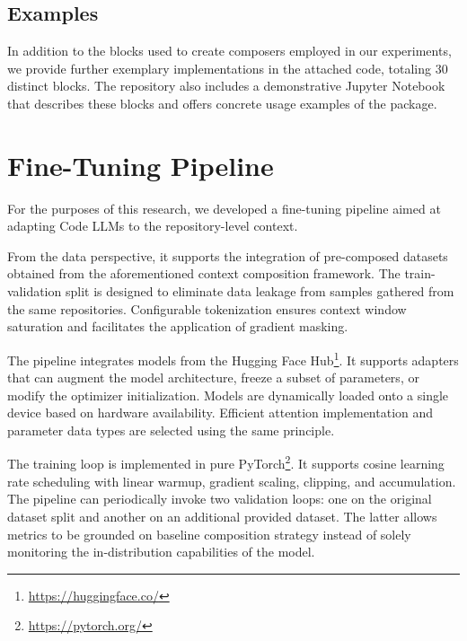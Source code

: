 \subsection{Examples}

In addition to the blocks used to create composers employed in our experiments, we provide further exemplary implementations in the attached code, totaling 30 distinct blocks. The repository also includes a demonstrative Jupyter Notebook that describes these blocks and offers concrete usage examples of the package.

\section{Fine-Tuning Pipeline}

For the purposes of this research, we developed a fine-tuning pipeline aimed at adapting Code LLMs to the repository-level context.

From the data perspective, it supports the integration of pre-composed datasets obtained from the aforementioned context composition framework. The train-validation split is designed to eliminate data leakage from samples gathered from the same repositories. Configurable tokenization ensures context window saturation and facilitates the application of gradient masking.

The pipeline integrates models from the Hugging Face Hub\footnote{\url{https://huggingface.co/}}. It supports adapters that can augment the model architecture, freeze a subset of parameters, or modify the optimizer initialization. Models are dynamically loaded onto a single device based on hardware availability. Efficient attention implementation and parameter data types are selected using the same principle.

The training loop is implemented in pure PyTorch\footnote{\url{https://pytorch.org/}}. It supports cosine learning rate scheduling with linear warmup, gradient scaling, clipping, and accumulation. The pipeline can periodically invoke two validation loops: one on the original dataset split and another on an additional provided dataset. The latter allows metrics to be grounded on baseline composition strategy instead of solely monitoring the in-distribution capabilities of the model.

